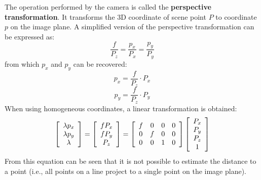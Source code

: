 The operation performed by the camera is called the \textbf{perspective transformation}.
It transforms the 3D coordinate of scene point $P$ to coordinate $p$ on the image plane.
A simplified version of the perspective transformation can be expressed as:
\begin{equation}
\frac{f}{P_z} = \frac{p_x}{P_x} = \frac{p_y}{P_y}
\end{equation}
from which $p_x$ and $p_y$ can be recovered:
\begin{equation}
p_x = \frac{f}{P_z} \cdot P_x
\end{equation}
\begin{equation}
p_y = \frac{f}{P_z} \cdot P_y
\end{equation}
When using homogeneous coordinates, a linear transformation is obtained:
\begin{equation}
\left[ \begin{array}{c}
\lambda p_x \\
\lambda p_y \\
\lambda
\end{array} \right]
=
\left[ \begin{array}{c}
f P_x \\
f P_y \\
P_z
\end{array} \right]
=
\left[ \begin{array}{c c c c}
f & 0 & 0 & 0  \\
0 & f & 0 & 0 \\
0 & 0 & 1 & 0
\end{array} \right]
\left[ \begin{array}{c}
P_x \\
P_y \\
P_z \\
1
\end{array} \right]
\end{equation}
From this equation can be seen that it is not possible to estimate the distance to a point (i.e., all points on a line project to a single point on the image plane).

